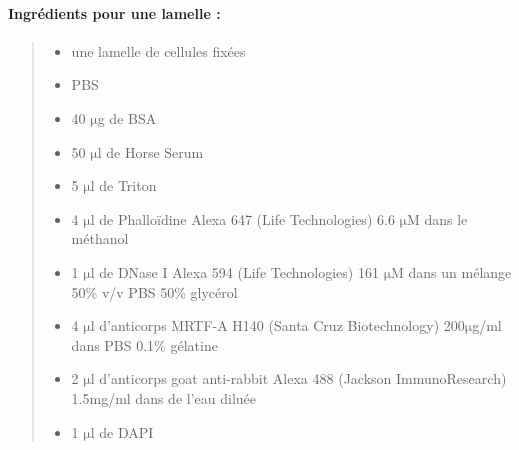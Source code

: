 \documentclass{report}
\newcommand{\micro}{$\mathrm{\mu}$}
\begin{document}
 \paragraph{Ingrédients pour une lamelle : }
 \begin{quote}
 
 
 \begin{itemize}
 \item une lamelle de cellules fixées
 \item PBS
 \item 40 \micro g de BSA
 \item 50 \micro l de Horse Serum
 \item 5 \micro l de Triton
 \item 4 \micro l de Phalloïdine Alexa 647 (Life Technologies) 6.6 \micro M dans le méthanol
 \item 1 \micro l de DNase I Alexa 594 (Life Technologies) 161 \micro M dans un mélange 50\% v/v PBS 50\% glycérol
 \item 4 \micro l d'anticorps MRTF-A H140 (Santa Cruz Biotechnology) 200\micro g/ml dans PBS 0.1\% gélatine
 \item 2 \micro l d'anticorps goat anti-rabbit Alexa 488 (Jackson ImmunoResearch) 1.5mg/ml dans de l'eau diluée
 \item 1 \micro l de DAPI
 \end{itemize}
\end{quote}
\end{document}
